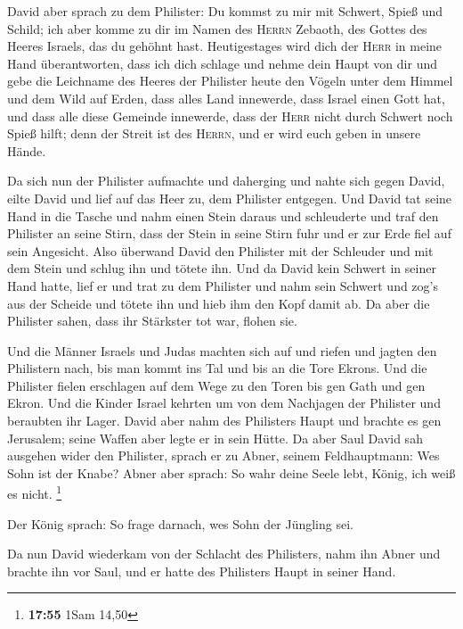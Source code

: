 David aber sprach zu dem Philister: Du kommst zu mir mit
Schwert, Spieß und Schild; ich aber komme zu dir im Namen des
\textsc{Herrn} Zebaoth, des Gottes des Heeres Israels, das du gehöhnt
hast.  Heutigestages wird dich der \textsc{Herr} in meine
Hand überantworten, dass ich dich schlage und nehme dein Haupt von dir
und gebe die Leichname des Heeres der Philister heute den Vögeln unter
dem Himmel und dem Wild auf Erden, dass alles Land innewerde, dass
Israel einen Gott hat,  und dass alle diese Gemeinde
innewerde, dass der \textsc{Herr} nicht durch Schwert noch Spieß hilft;
denn der Streit ist des \textsc{Herrn}, und er wird euch geben in unsere
Hände.

 Da sich nun der Philister aufmachte und daherging und
nahte sich gegen David, eilte David und lief auf das Heer zu, dem
Philister entgegen.  Und David tat seine Hand in die
Tasche und nahm einen Stein daraus und schleuderte und traf den
Philister an seine Stirn, dass der Stein in seine Stirn fuhr und er zur
Erde fiel auf sein Angesicht.  Also überwand David den
Philister mit der Schleuder und mit dem Stein und schlug ihn und tötete
ihn. Und da David kein Schwert in seiner Hand hatte, 
lief er und trat zu dem Philister und nahm sein Schwert und zog's aus
der Scheide und tötete ihn und hieb ihm den Kopf damit ab. Da aber die
Philister sahen, dass ihr Stärkster tot war, flohen sie.

 Und die Männer Israels und Judas machten sich auf und
riefen und jagten den Philistern nach, bis man kommt ins Tal und bis an
die Tore Ekrons. Und die Philister fielen erschlagen auf dem Wege zu den
Toren bis gen Gath und gen Ekron.  Und die Kinder Israel
kehrten um von dem Nachjagen der Philister und beraubten ihr Lager.
 David aber nahm des Philisters Haupt und brachte es gen
Jerusalem; seine Waffen aber legte er in sein Hütte.  Da
aber Saul David sah ausgehen wider den Philister, sprach er zu Abner,
seinem Feldhauptmann: Wes Sohn ist der Knabe? Abner aber sprach: So wahr
deine Seele lebt, König, ich weiß es nicht. \footnote{\textbf{17:55}
  1Sam 14,50}

 Der König sprach: So frage darnach, wes Sohn der
Jüngling sei.

 Da nun David wiederkam von der Schlacht des Philisters,
nahm ihn Abner und brachte ihn vor Saul, und er hatte des Philisters
Haupt in seiner Hand.

